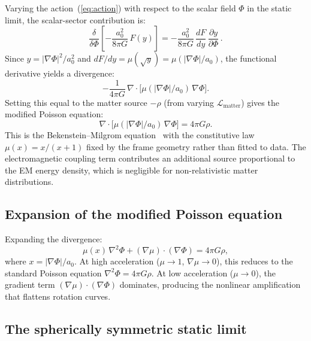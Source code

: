 \documentclass[11pt]{article}
\begin{document}
Varying the action~(\ref{eq:action}) with respect to the
scalar field $\Phi$ in the static limit, the scalar-sector
contribution is:
\begin{equation}
  \frac{\delta}{\delta\Phi}\left[
    -\frac{a_0^2}{8\pi G}\,F(y)
  \right]
  = -\frac{a_0^2}{8\pi G}\,\frac{dF}{dy}\,
    \frac{\partial y}{\partial\Phi}\,.
\end{equation}
Since $y = |\nabla\Phi|^2/a_0^2$ and
$dF/dy = \mu(\sqrt{y}) = \mu(|\nabla\Phi|/a_0)$,
the functional derivative yields a divergence:
\begin{equation}
  -\frac{1}{4\pi G}\,
  \nabla\!\cdot\!\bigl[
    \mu(|\nabla\Phi|/a_0)\,\nabla\Phi
  \bigr].
\end{equation}
Setting this equal to the matter source $-\rho$ (from
varying $\mathcal{L}_{\text{matter}}$) gives the
modified Poisson equation:
\begin{equation}
  \boxed{
  \nabla\!\cdot\!\bigl[
    \mu(|\nabla\Phi|/a_0)\,\nabla\Phi
  \bigr] = 4\pi G\rho.}
  \label{eq:modified_poisson}
\end{equation}
This is the Bekenstein--Milgrom
equation~\cite{BekensteinMilgrom1984} with the
constitutive law $\mu(x) = x/(x{+}1)$ fixed by the
frame geometry rather than fitted to data.
The electromagnetic coupling term contributes an
additional source proportional to the EM energy density,
which is negligible for non-relativistic matter
distributions.

\subsection*{Expansion of the modified Poisson equation}

Expanding the divergence:
\begin{equation}
  \mu(x)\,\nabla^2\Phi
  + (\nabla\mu)\cdot(\nabla\Phi) = 4\pi G\rho,
  \label{eq:expanded}
\end{equation}
where $x = |\nabla\Phi|/a_0$.  At high acceleration
($\mu \to 1$, $\nabla\mu \to 0$), this reduces to the
standard Poisson equation $\nabla^2\Phi = 4\pi G\rho$.
At low acceleration ($\mu \to 0$), the gradient term
$(\nabla\mu)\cdot(\nabla\Phi)$ dominates, producing the
nonlinear amplification that flattens rotation curves.

\subsection*{The spherically symmetric static limit}
\end{document}
